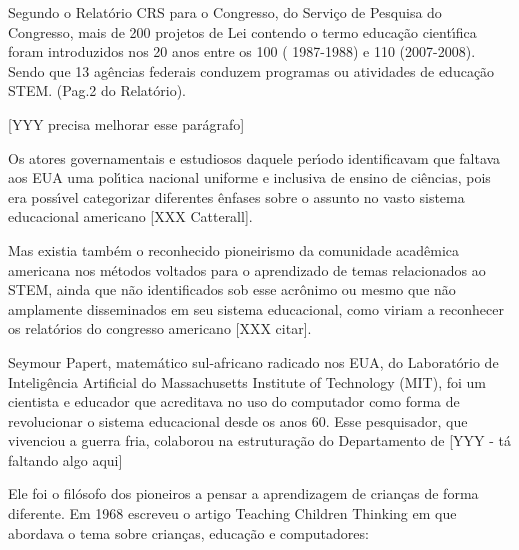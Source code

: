 \documentclass[
12pt,		%
openright,	%
twoside,  %
a4paper,			%
chapter=TITLE,		%
english,			%
french,				%
spanish,			%
brazil				%
]{USPSC-classe/USPSC_RedarTex}
\begin{document}
Segundo o Relat\'orio CRS para o Congresso, do Servi\c{c}o de Pesquisa do Congresso, mais de 200 projetos de Lei contendo o termo \textquotedbl  educa\c{c}\~ao cient\'{\i}fica \textquotedbl  foram introduzidos nos 20 anos entre os 100 ( 1987-1988) e 110 (2007-2008). Sendo que 13 ag\^encias federais conduzem programas ou atividades de educa\c{c}\~ao STEM. (Pag.2 do Relat\'orio). 










[YYY precisa melhorar esse par\'agrafo]










Os atores governamentais e estudiosos daquele per\'{\i}odo identificavam que faltava aos EUA uma pol\'{\i}tica nacional uniforme e inclusiva de ensino de ci\^encias, pois era poss\'{\i}vel categorizar diferentes \^enfases sobre o assunto no vasto sistema educacional americano [XXX Catterall].










Mas existia tamb\'em o reconhecido pioneirismo da comunidade acad\^emica americana nos m\'etodos voltados para o aprendizado de temas relacionados ao STEM, ainda que n\~ao identificados sob esse acr\^onimo ou mesmo que n\~ao amplamente disseminados em seu sistema educacional, como viriam a reconhecer os relat\'orios do congresso americano [XXX citar]. 










Seymour Papert, matem\'atico sul-africano radicado nos EUA, do Laborat\'orio de Intelig\^encia Artificial do Massachusetts Institute of Technology (MIT), foi um  cientista e educador que acreditava  no  uso do computador como forma de revolucionar o sistema  educacional  desde os anos 60. Esse pesquisador, que vivenciou a guerra fria, colaborou na estrutura\c{c}\~ao do Departamento de  [YYY - t\'a faltando algo aqui]










Ele foi o \textquotedbl fil\'osofo dos pioneiros a pensar a aprendizagem de crian\c{c}as de forma diferente. Em 1968 escreveu o artigo \textquotedbl  Teaching Children Thinking \textquotedbl   em que abordava  o tema sobre crian\c{c}as, educa\c{c}\~ao e computadores: 
\end{document}
